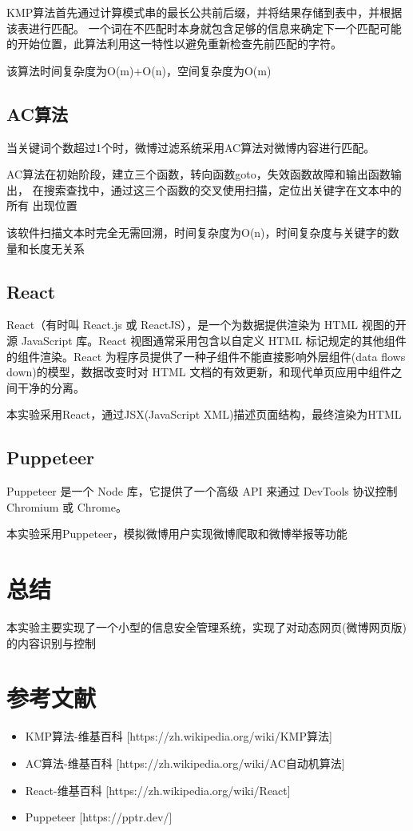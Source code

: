 \documentclass{ctexart}
\begin{document}
KMP算法首先通过计算模式串的最长公共前后缀，并将结果存储到表中，并根据该表进行匹配。
一个词在不匹配时本身就包含足够的信息来确定下一个匹配可能的开始位置，此算法利用这一特性以避免重新检查先前匹配的字符。

该算法时间复杂度为O(m)+O(n)，空间复杂度为O(m)
\subsection{AC算法}
当关键词个数超过1个时，微博过滤系统采用AC算法对微博内容进行匹配。

AC算法在初始阶段，建立三个函数，转向函数goto，失效函数故障和输出函数输出，
在搜索查找中，通过这三个函数的交叉使用扫描，定位出关键字在文本中的所有
出现位置

该软件扫描文本时完全无需回溯，时间复杂度为O(n)，时间复杂度与关键字的数量和长度无关系
\subsection{React}
React（有时叫 React.js 或 ReactJS），是一个为数据提供渲染为 HTML 视图的开源 JavaScript 库。React 视图通常采用包含以自定义 HTML 标记规定的其他组件的组件渲染。React 为程序员提供了一种子组件不能直接影响外层组件(data flows down)的模型，数据改变时对 HTML 文档的有效更新，和现代单页应用中组件之间干净的分离。

本实验采用React，通过JSX(JavaScript XML)描述页面结构，最终渲染为HTML
\subsection{Puppeteer}
Puppeteer 是一个 Node 库，它提供了一个高级 API 来通过 DevTools 协议控制 Chromium 或 Chrome。

本实验采用Puppeteer，模拟微博用户实现微博爬取和微博举报等功能
\section{总结}
本实验主要实现了一个小型的信息安全管理系统，实现了对动态网页(微博网页版)的内容识别与控制

\section{参考文献}
\begin{itemize}
    \item KMP算法-维基百科 [https://zh.wikipedia.org/wiki/KMP算法]
    \item AC算法-维基百科 [https://zh.wikipedia.org/wiki/AC自动机算法]
    \item React-维基百科 [https://zh.wikipedia.org/wiki/React]
    \item Puppeteer [https://pptr.dev/]
\end{itemize}
\end{document}
